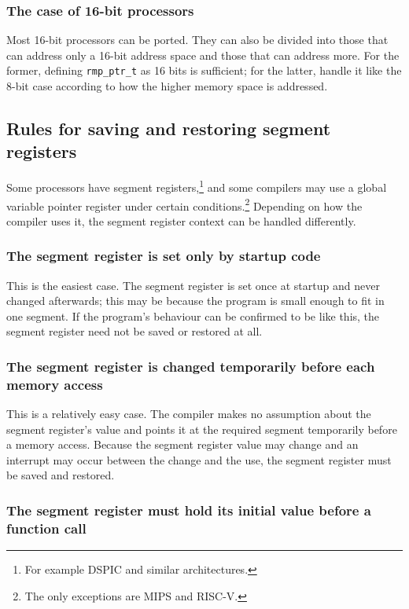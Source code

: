 \subsubsection{The case of 16-bit processors}

Most 16-bit processors can be ported.
They can also be divided into those that can address only a 16-bit address space and those that can address more.
For the former, defining \texttt{rmp\_ptr\_t} as 16 bits is sufficient; for the latter, handle it like the 8-bit case according to how the higher memory space is addressed.

\subsection{Rules for saving and restoring segment registers}

Some processors have segment registers,\footnote{For example DSPIC and similar architectures.} and some compilers may use a global variable pointer register under certain conditions.\footnote{The only exceptions are MIPS and RISC-V.}
Depending on how the compiler uses it, the segment register context can be handled differently.

\subsubsection{The segment register is set only by startup code}

This is the easiest case.
The segment register is set once at startup and never changed afterwards; this may be because the program is small enough to fit in one segment.
If the program's behaviour can be confirmed to be like this, the segment register need not be saved or restored at all.

\subsubsection{The segment register is changed temporarily before each memory access}

This is a relatively easy case.
The compiler makes no assumption about the segment register's value and points it at the required segment temporarily before a memory access.
Because the segment register value may change and an interrupt may occur between the change and the use, the segment register must be saved and restored.

\subsubsection{The segment register must hold its initial value before a function call}

